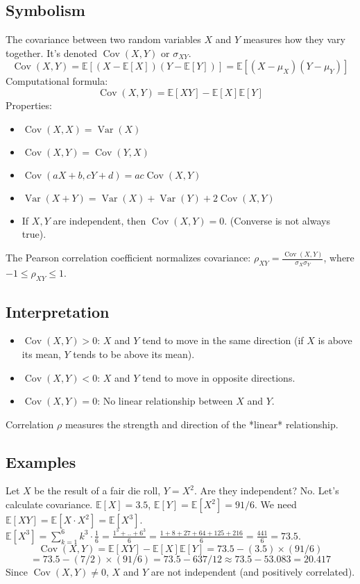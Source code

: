 \documentclass{article}
\newcommand{\E}{\mathbb{E}}    %
\DeclareMathOperator{\Var}{Var} %
\DeclareMathOperator{\Cov}{Cov} %
\begin{document}
\subsection*{Symbolism}
The covariance between two random variables $X$ and $Y$ measures how they vary together. It's denoted $\Cov(X, Y)$ or $\sigma_{XY}$.
\[ \Cov(X, Y) = \E[(X - \E[X])(Y - \E[Y])] = \E[(X - \mu_X)(Y - \mu_Y)] \]
Computational formula:
\[ \Cov(X, Y) = \E[XY] - \E[X]\E[Y] \]
Properties:
\begin{itemize}
    \item $\Cov(X, X) = \Var(X)$
    \item $\Cov(X, Y) = \Cov(Y, X)$
    \item $\Cov(aX+b, cY+d) = ac \Cov(X, Y)$
    \item $\Var(X+Y) = \Var(X) + \Var(Y) + 2\Cov(X, Y)$
    \item If $X, Y$ are independent, then $\Cov(X, Y) = 0$. (Converse is not always true).
\end{itemize}
The Pearson correlation coefficient normalizes covariance: $\rho_{XY} = \frac{\Cov(X, Y)}{\sigma_X \sigma_Y}$, where $-1 \le \rho_{XY} \le 1$.

\subsection*{Interpretation}
\begin{itemize}
    \item $\Cov(X, Y) > 0$: $X$ and $Y$ tend to move in the same direction (if $X$ is above its mean, $Y$ tends to be above its mean).
    \item $\Cov(X, Y) < 0$: $X$ and $Y$ tend to move in opposite directions.
    \item $\Cov(X, Y) = 0$: No linear relationship between $X$ and $Y$.
\end{itemize}
Correlation $\rho$ measures the strength and direction of the *linear* relationship.

\subsection*{Examples}
Let $X$ be the result of a fair die roll, $Y = X^2$. Are they independent? No. Let's calculate covariance.
$\E[X] = 3.5$, $\E[Y] = \E[X^2] = 91/6$.
We need $\E[XY] = \E[X \cdot X^2] = \E[X^3]$.
$\E[X^3] = \sum_{k=1}^6 k^3 \cdot \frac{1}{6} = \frac{1^3+..+6^3}{6} = \frac{1+8+27+64+125+216}{6} = \frac{441}{6} = 73.5$.
\[ \Cov(X, Y) = \E[XY] - \E[X]\E[Y] = 73.5 - (3.5) \times (91/6) \]
\[ = 73.5 - (7/2) \times (91/6) = 73.5 - 637/12 \approx 73.5 - 53.083 = 20.417 \]
Since $\Cov(X, Y) \neq 0$, $X$ and $Y$ are not independent (and positively correlated).
\end{document}

